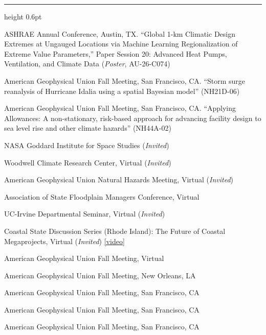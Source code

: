 \documentclass[10.5pt]{article}
\newcommand{\cvsection}[1]{%
  \par\addvspace{12pt}\pagebreak[3]%
  {\sffamily\bfseries\small\textls[80]{\MakeUppercase{#1}}}%
  \par\vspace{2pt}%
  {\color{rulegray}\hrule height 0.6pt}%
  \vspace{5pt}\nopagebreak}
\renewcommand{\section}[1]{\cvsection{#1}}
\newcommand{\yr}[1]{{\sffamily\bfseries #1}}
\begin{document}
\section{Presentations}
\begin{entries}
\item[\yr{2026}] ASHRAE Annual Conference, Austin, TX. ``Global 1-km Climatic Design Extremes at Ungauged Locations via Machine Learning Regionalization of Extreme Value Parameters,'' Paper Session 20: Advanced Heat Pumps, Ventilation, and Climate Data (\emph{Poster}, AU-26-C074)
\item[\yr{2023}] American Geophysical Union Fall Meeting, San Francisco, CA. ``Storm surge reanalysis of Hurricane Idalia using a spatial Bayesian model'' (NH21D-06)
\item[\yr{2023}] American Geophysical Union Fall Meeting, San Francisco, CA. ``Applying Allowances: A non-stationary, risk-based approach for advancing facility design to sea level rise and other climate hazards'' (NH44A-02)
\item[\yr{2021}] NASA Goddard Institute for Space Studies (\emph{Invited})
\item[\yr{2021}] Woodwell Climate Research Center, Virtual (\emph{Invited})
\item[\yr{2021}] American Geophysical Union Natural Hazards Meeting, Virtual (\emph{Invited})
\item[\yr{2021}] Association of State Floodplain Managers Conference, Virtual
\item[\yr{2021}] UC-Irvine Departmental Seminar, Virtual (\emph{Invited})
\item[\yr{2021}] Coastal State Discussion Series (Rhode Island): The Future of Coastal Megaprojects, Virtual (\emph{Invited}) \href{https://www.youtube.com/watch?v=PGbNXaviStM}{[video]}
\item[\yr{2020}] American Geophysical Union Fall Meeting, Virtual
\item[\yr{2017}] American Geophysical Union Fall Meeting, New Orleans, LA
\item[\yr{2015}] American Geophysical Union Fall Meeting, San Francisco, CA
\item[\yr{2014}] American Geophysical Union Fall Meeting, San Francisco, CA
\item[\yr{2011}] American Geophysical Union Fall Meeting, San Francisco, CA
\end{entries}
\end{document}
